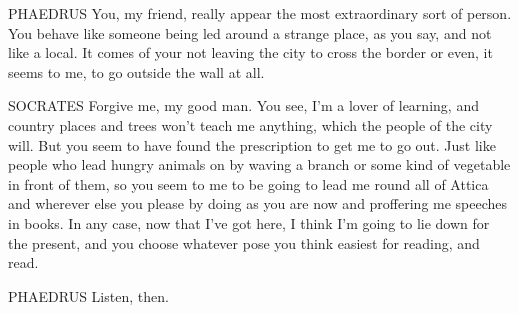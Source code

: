 PHAEDRUS You, my friend, really appear the most
extraordinary sort of
person. You behave like someone being led around a strange place, as you
say, and not like a local. It comes  of your not leaving the
city to cross the border or even, it seems to me, to go outside the wall
at all.

SOCRATES Forgive me, my good man. You see, I'm a lover of learning, and
country places and trees won't teach me anything,  which the
people of the city will.
But you seem to have found the
prescription to get me to
go out. Just like people who lead hungry animals on by waving a branch
or some kind of vegetable in front of them, so you seem to me to be
going to lead me round all of Attica and wherever else you please by
 doing as you are now and proffering me speeches in
books. In any case, now
that I've got here, I think I'm going to lie down for the present, and
you choose whatever pose you think easiest for reading, and read.

PHAEDRUS Listen, then.


